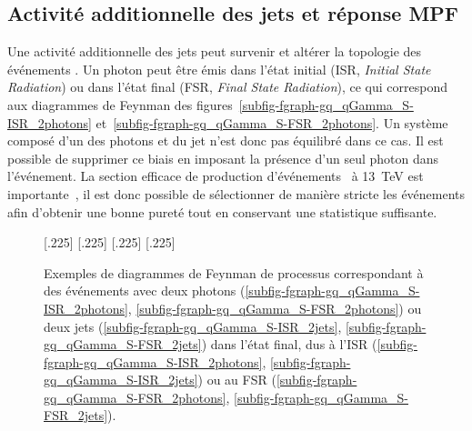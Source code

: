 \subsection{Activité additionnelle des jets et réponse MPF}\label{chapter-JERC-section-pheno-GJets-subsec-effets_radiatifs}
Une activité additionnelle des jets peut survenir et altérer la topologie des événements \Gjets.
Un photon peut être émis dans l'état initial (ISR, \emph{Initial State Radiation}) ou dans l'état final (FSR, \emph{Final State Radiation}), ce qui correspond aux diagrammes de Feynman des figures~\ref{subfig-fgraph-gq_qGamma_S-ISR_2photons} et~\ref{subfig-fgraph-gq_qGamma_S-FSR_2photons}.
Un système composé d'un des photons et du jet n'est donc pas équilibré dans ce cas.
Il est possible de supprimer ce biais en imposant la présence d'un seul photon dans l'événement.
La section efficace de production d'événements \Gjets\ à \SI{13}{\TeV} est importante~\cite{Gjet_xsec_2018}, il est donc possible de sélectionner de manière stricte les événements afin d'obtenir une bonne pureté tout en conservant une statistique suffisante.
\begin{figure}[h]
\centering\vspace{\baselineskip}
\subcaptionbox{\label{subfig-fgraph-gq_qGamma_S-ISR_2photons}}[.225\textwidth]
{\vspace{\baselineskip}}
\hfill
\subcaptionbox{\label{subfig-fgraph-gq_qGamma_S-FSR_2photons}}[.225\textwidth]
{\vspace{\baselineskip}}
\hfill
\subcaptionbox{\label{subfig-fgraph-gq_qGamma_S-ISR_2jets}}[.225\textwidth]
{\vspace{\baselineskip}}
\hfill
\subcaptionbox{\label{subfig-fgraph-gq_qGamma_S-FSR_2jets}}[.225\textwidth]
{\vspace{\baselineskip}}
\caption[Diagrammes de Feynman de processus avec ISR ou FSR.]{Exemples de diagrammes de Feynman de processus correspondant à des événements avec deux photons (\ref{subfig-fgraph-gq_qGamma_S-ISR_2photons}, \ref{subfig-fgraph-gq_qGamma_S-FSR_2photons}) ou deux jets (\ref{subfig-fgraph-gq_qGamma_S-ISR_2jets}, \ref{subfig-fgraph-gq_qGamma_S-FSR_2jets}) dans l'état final, dus à l'ISR (\ref{subfig-fgraph-gq_qGamma_S-ISR_2photons}, \ref{subfig-fgraph-gq_qGamma_S-ISR_2jets}) ou au FSR (\ref{subfig-fgraph-gq_qGamma_S-FSR_2photons}, \ref{subfig-fgraph-gq_qGamma_S-FSR_2jets}).}
\label{fig-fgraph-gamma_plus_jets-ISR-FSR}
\end{figure}
